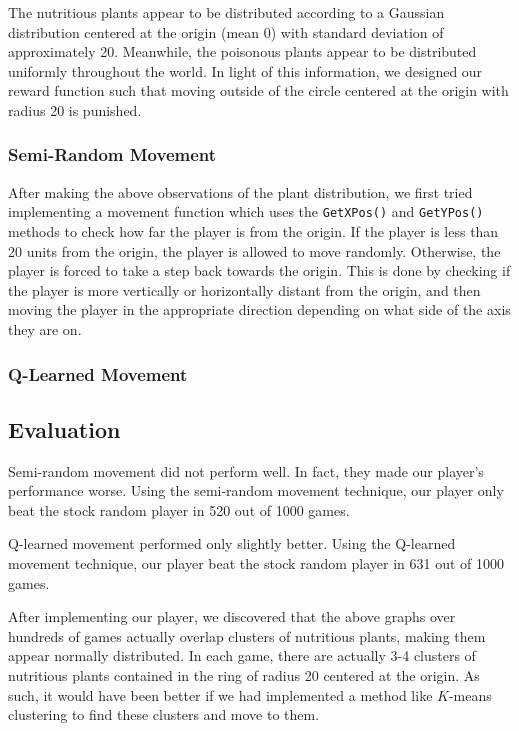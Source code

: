 \documentclass[solution, letterpaper]{cs121}
\begin{document}
The nutritious plants appear to be distributed according to a Gaussian distribution centered at the origin (mean 0) with standard deviation of approximately 20. Meanwhile, the poisonous plants appear to be distributed uniformly throughout the world. In light of this information, we designed our reward function such that moving outside of the circle centered at the origin with radius 20 is punished.

\subsubsection{Semi-Random Movement}
After making the above observations of the plant distribution, we first tried implementing a movement function which uses the {\tt GetXPos()} and {\tt GetYPos()} methods to check how far the player is from the origin. If the player is less than 20 units from the origin, the player is allowed to move randomly. Otherwise, the player is forced to take a step back towards the origin. This is done by checking if the player is more vertically or horizontally distant from the origin, and then moving the player in the appropriate direction depending on what side of the axis they are on.

\subsubsection{Q-Learned Movement}

\subsection{Evaluation}
Semi-random movement did not perform well. In fact, they made our player's performance worse. Using the semi-random movement technique, our player only beat the stock random player in 520 out of 1000 games.

Q-learned movement performed only slightly better. Using the Q-learned movement technique, our player beat the stock random player in 631 out of 1000 games.

After implementing our player, we discovered that the above graphs over hundreds of games actually overlap clusters of nutritious plants, making them appear normally distributed. In each game, there are actually 3-4 clusters of nutritious plants contained in the ring of radius 20 centered at the origin. As such, it would have been better if we had implemented a method like $K$-means clustering to find these clusters and move to them.
\end{document}
